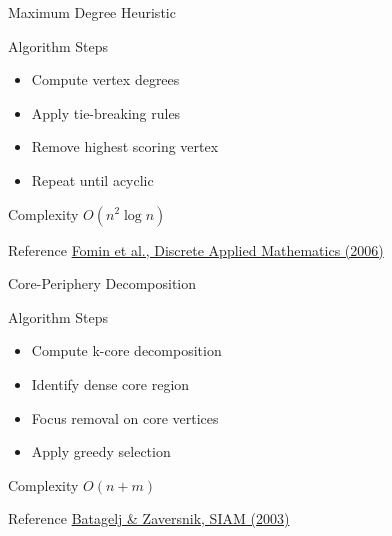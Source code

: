 \documentclass[aspectratio=169]{beamer}
\begin{document}
\begin{frame}{Maximum Degree Heuristic}

\begin{block}{Algorithm Steps}
\begin{itemize}
\item Compute vertex degrees
\item Apply tie-breaking rules
\item Remove highest scoring vertex
\item Repeat until acyclic
\end{itemize}
\end{block}

\begin{exampleblock}{Complexity}
$O(n^2 \log n)$
\end{exampleblock}

\begin{alertblock}{Reference}
\href{https://doi.org/10.1016/j.dam.2005.05.007}{Fomin et al., Discrete Applied Mathematics (2006)}
\end{alertblock}

\end{frame}

\begin{frame}{Core-Periphery Decomposition}

\begin{block}{Algorithm Steps}
\begin{itemize}
\item Compute k-core decomposition
\item Identify dense core region
\item Focus removal on core vertices
\item Apply greedy selection
\end{itemize}
\end{block}

\begin{exampleblock}{Complexity}
$O(n + m)$
\end{exampleblock}

\begin{alertblock}{Reference}
\href{https://doi.org/10.1137/1.9781611972832.4}{Batagelj \& Zaversnik, SIAM (2003)}
\end{alertblock}

\end{frame}
\end{document}
